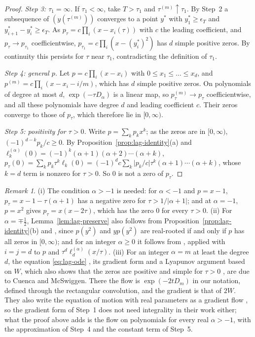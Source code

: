 \documentclass[11pt]{amsart}
\theoremstyle{definition}
\theoremstyle{remark}
\newtheorem{remark}[theorem]{Remark}
\numberwithin{equation}{section}
\begin{document}
\begin{proof}
\emph{Step 3: $\tau_1=\infty$.} If $\tau_1<\infty$, take $T>\tau_1$ and $\tau^{(m)}\uparrow\tau_1$. By Step~2 a subsequence of $(y(\tau^{(m)}))$ converges to a point $y^*$ with $y^*_1\ge\epsilon_T$ and $y^*_{i+1}-y^*_i\ge\epsilon_T$. As $p_\tau=c\prod_i(x-x_i(\tau))$ with $c$ the leading coefficient, and $p_\tau\to p_{\tau_1}$ coefficientwise, $p_{\tau_1}=c\prod_i(x-(y^*_i)^2)$ has $d$ simple positive zeros. By continuity this persists for $\tau$ near $\tau_1$, contradicting the definition of $\tau_1$.

\emph{Step 4: general $p$.} Let $p=c\prod_i(x-x_i)$ with $0\le x_1\le\dots\le x_d$, and $p^{(m)}=c\prod_i(x-x_i-i/m)$, which has $d$ simple positive zeros. On polynomials of degree at most $d$, $\exp(-\tau D_\alpha)$ is a linear map, so $p^{(m)}_\tau\to p_\tau$ coefficientwise, and all these polynomials have degree $d$ and leading coefficient $c$. Their zeros converge to those of $p_\tau$, which therefore lie in $[0,\infty)$.

\emph{Step 5: positivity for $\tau>0$.} Write $p=\sum_kp_kx^k$; as the zeros are in $[0,\infty)$, $(-1)^{d-k}p_k/c\ge0$. By Proposition~\ref{prop:lag-identity}(a) and $\ell^{(\alpha)}_k(0)=(-1)^k(\alpha+1)(\alpha+2)\cdots(\alpha+k)$, $p_\tau(0)=\sum_kp_k\tau^k\ell_k(0)=(-1)^dc\sum_k\bigl|p_k/c\bigr|\tau^k(\alpha+1)\cdots(\alpha+k)$, whose $k=d$ term is nonzero for $\tau>0$. So $0$ is not a zero of $p_\tau$.
\end{proof}

\begin{remark}\label{rem:lag-special}
(i) The condition $\alpha>-1$ is needed: for $\alpha<-1$ and $p=x-1$, $p_\tau=x-1-\tau(\alpha+1)$ has a negative zero for $\tau>1/|\alpha+1|$; and at $\alpha=-1$, $p=x^2$ gives $p_\tau=x(x-2\tau)$, which has the zero $0$ for every $\tau>0$. (ii) For $\alpha=\mp\frac12$, Lemma~\ref{lem:lag-preserve} also follows from Proposition~\ref{prop:lag-identity}(b) and \cite[Lemma~\ref{M-lem:heat}(b)]{Main}, since $p(y^2)$ and $yp(y^2)$ are real-rooted if and only if $p$ has all zeros in $[0,\infty)$; and for an integer $\alpha\ge0$ it follows from \cite[Theorem~2.3]{GM}, applied with $i=j=d$ to $p$ and $\tau^d\ell^{(\alpha)}_d(x/\tau)$. (iii) For an integer $\alpha=m$ at least the degree $d$, the equation \eqref{eq:lag-ode} \cite[Theorem~2.7]{CM}, its gradient form \cite[Proposition~2.8]{CM} and a Lyapunov argument based on $W$, which also shows that the zeros are positive and simple for $\tau>0$ \cite[Theorem~3.4]{CM}, are due to Cuenca and McSwiggen. There the flow is $\exp(-2tD_m)$ in our notation, defined through the rectangular convolution, and the gradient is that of $2W$. They also write the equation of motion with real parameters as a gradient flow \cite[Section~5.1]{CM}, so the gradient form of Step~1 does not need integrality in their work either; what the proof above adds is the flow on polynomials for every real $\alpha>-1$, with the approximation of Step~4 and the constant term of Step~5.
\end{remark}
\end{document}
